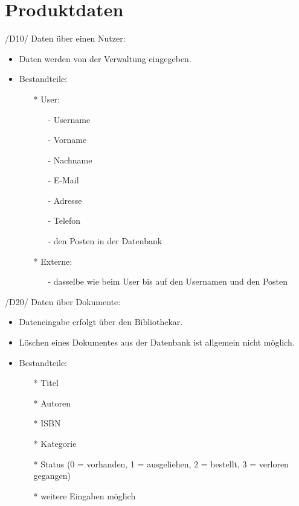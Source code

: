 
\chapter{Produktdaten}
/D10/ Daten über einen Nutzer: 
\begin{itemize}
  \item Daten werden von der Verwaltung eingegeben.
  \item Bestandteile: 
  \begin{itemize}
    \item[*] User: 
    \begin{itemize}
      \item[-] Username
      \item[-] Vorname
      \item[-] Nachname
      \item[-] E-Mail
      \item[-] Adresse
      \item[-] Telefon
      \item[-] den Posten in der Datenbank
    \end{itemize}
    \item[*] Externe: 
    \begin{itemize}
      \item[-] dasselbe wie beim User bis auf den Usernamen und den Posten
    \end{itemize}
  \end{itemize}
\end{itemize}

\newpage

/D20/ Daten über Dokumente: 
\begin{itemize}
  \item Dateneingabe erfolgt über den Bibliothekar.
  \item Löschen eines Dokumentes aus der Datenbank ist allgemein nicht möglich.
  \item Bestandteile: 
  \begin{itemize}
    \item[*] Titel
    \item[*] Autoren
    \item[*] ISBN
    \item[*] Kategorie
    \item[*] Status (0 = vorhanden, 1 = ausgeliehen, 2 = bestellt, 3 = verloren gegangen)
    \item[*] weitere Eingaben möglich
  \end{itemize}
\end{itemize}

